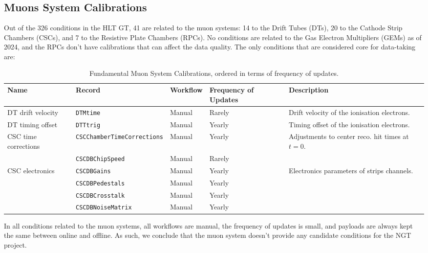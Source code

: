 \subsection{Muons System Calibrations}

Out of the 326 conditions in the HLT GT,
41 are related to the muon systems:
14 to the Drift Tubes (DTs),
20 to the Cathode Strip Chambers (CSCs),
and
7 to the Resistive Plate Chambers (RPCs).
No conditions are related to the Gas Electron Multipliers (GEMs) as of 2024,
and
the RPCs don't have calibrations that can affect the data quality.
The only conditions that are considered core for data-taking are:
\begin{table}[h!]
    \centering
    \begin{adjustbox}{max width=\textwidth}
    \begin{tabular}{p{3.5cm}|p{4.5cm}|p{2.5cm}|p{2cm}|p{4cm}}
        \textbf{Name} & \textbf{Record} & \textbf{Workflow} & \textbf{Frequency of Updates} & \textbf{Description} \\ \hline
    DT drift velocity & \texttt{DTMtime} & Manual & Rarely & Drift velocity of the ionisation electrons. \\ 
    DT timing offset & \texttt{DTTtrig} & Manual & Yearly & Timing offset of the ionisation electrons. \\ 
    CSC time corrections 	& \texttt{CSCChamberTimeCorrections} & Manual & Yearly & Adjustments to center reco. hit times at $t=0$. \\
    						& \texttt{CSCDBChipSpeed} & Manual & Rarely & \\ 
	CSC electronics & \texttt{CSCDBGains} & Manual & Yearly & Electronics parameters of strips channels. \\
                    & \texttt{CSCDBPedestals} & Manual & Yearly &  \\
					& \texttt{CSCDBCrosstalk} & Manual & Yearly &  \\ 
                    & \texttt{CSCDBNoiseMatrix} & Manual & Yearly &  \\
    \end{tabular}
    \end{adjustbox}
    \caption{Fundamental Muon System Calibrations, ordered in terms of frequency of updates.}
    \label{tab:MuonCalibrations_critical}
\end{table}

In all conditions related to the muon systems, all workflows are manual, the frequency of updates is small, and payloads are always kept the same between online and offline.
As such, we conclude that the muon system doesn't provide any candidate conditions for the NGT project.
